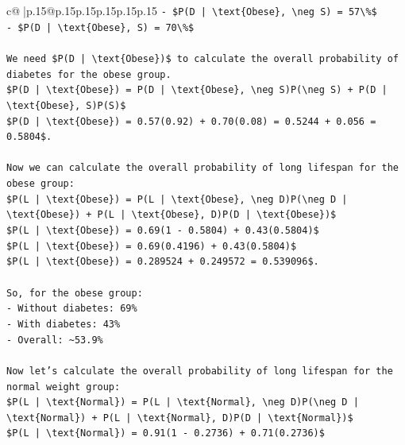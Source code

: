 \documentclass{article}
\begin{document}
{\begin{supertabular}{c@{$\;$}|p{.15\linewidth}@{}p{.15\linewidth}p{.15\linewidth}p{.15\linewidth}p{.15\linewidth}p{.15\linewidth}}
{{{\texttt{{-} \$P(D | \textbackslash{}text\{Obese\}, \textbackslash{}neg S) = 57\textbackslash{}\%\$} \\
\texttt{{-} \$P(D | \textbackslash{}text\{Obese\}, S) = 70\textbackslash{}\%\$} \\
\\ 
\texttt{We need \$P(D | \textbackslash{}text\{Obese\})\$ to calculate the overall probability of diabetes for the obese group.} \\
\texttt{\$P(D | \textbackslash{}text\{Obese\}) = P(D | \textbackslash{}text\{Obese\}, \textbackslash{}neg S)P(\textbackslash{}neg S) + P(D | \textbackslash{}text\{Obese\}, S)P(S)\$} \\
\texttt{\$P(D | \textbackslash{}text\{Obese\}) = 0.57(0.92) + 0.70(0.08) = 0.5244 + 0.056 = 0.5804\$.} \\
\\ 
\texttt{Now we can calculate the overall probability of long lifespan for the obese group:} \\
\texttt{\$P(L | \textbackslash{}text\{Obese\}) = P(L | \textbackslash{}text\{Obese\}, \textbackslash{}neg D)P(\textbackslash{}neg D | \textbackslash{}text\{Obese\}) + P(L | \textbackslash{}text\{Obese\}, D)P(D | \textbackslash{}text\{Obese\})\$} \\
\texttt{\$P(L | \textbackslash{}text\{Obese\}) = 0.69(1 {-} 0.5804) + 0.43(0.5804)\$} \\
\texttt{\$P(L | \textbackslash{}text\{Obese\}) = 0.69(0.4196) + 0.43(0.5804)\$} \\
\texttt{\$P(L | \textbackslash{}text\{Obese\}) = 0.289524 + 0.249572 = 0.539096\$.} \\
\\ 
\texttt{So, for the obese group:} \\
\texttt{{-} Without diabetes: 69\%} \\
\texttt{{-} With diabetes: 43\%} \\
\texttt{{-} Overall: \textasciitilde{}53.9\%} \\
\\ 
\texttt{Now let's calculate the overall probability of long lifespan for the normal weight group:} \\
\texttt{\$P(L | \textbackslash{}text\{Normal\}) = P(L | \textbackslash{}text\{Normal\}, \textbackslash{}neg D)P(\textbackslash{}neg D | \textbackslash{}text\{Normal\}) + P(L | \textbackslash{}text\{Normal\}, D)P(D | \textbackslash{}text\{Normal\})\$} \\
\texttt{\$P(L | \textbackslash{}text\{Normal\}) = 0.91(1 {-} 0.2736) + 0.71(0.2736)\$} \\
}}}
\end{supertabular}}
\end{document}
